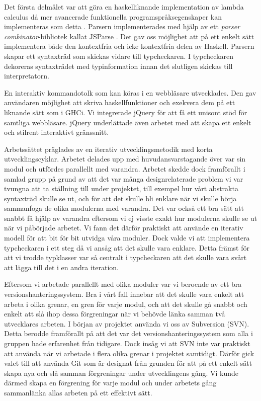 Det första delmålet var att göra en haskelliknande implementation av lambda calculus då mer avancerade funktionella programspråksegenskaper kan implementeras som detta \citep{jones87}.
Parsern implementerades med hjälp av ett \emph{parser combinator}-bibliotek kallat JSParse \citep{jsparse}. Det gav oss möjlighet att på ett enkelt sätt implementera både den kontextfria och icke kontextfria delen av Haskell. Parsern skapar ett syntaxträd som skickas vidare till typcheckaren. I typcheckaren dekoreras syntaxträdet med typinformation innan det slutligen skickas till interpretatorn.

En interaktiv kommandotolk som kan köras i en webbläsare utvecklades. Den gav användaren möjlighet att skriva haskellfunktioner och exekvera dem på ett liknande sätt som i GHCi. 
Vi integrerade jQuery \citep{jquery} för att få ett unisont stöd för samtliga webbläsare. jQuery underlättade även arbetet med att skapa ett enkelt och stilrent interaktivt gränssnitt.

Arbetssättet präglades av en iterativ utvecklingsmetodik med korta utvecklingscyklar. Arbetet delades upp med huvudansvarstagande över var sin modul och utfördes parallellt med varandra. Arbetet skedde dock framförallt i samlad grupp på grund av att det var många designrelaterade problem vi var tvungna att ta ställning till under projektet, till exempel hur vårt abstrakta syntaxträd skulle se ut, och för att det skulle bli enklare när vi skulle börja sammanfoga de olika modulerna med varandra. 
Det var också ett bra sätt att snabbt få hjälp av varandra eftersom vi ej visste exakt hur modulerna skulle se ut när vi påbörjade arbetet. Vi fann det därför praktiskt att använde en iterativ modell för att bit för bit utvidga våra moduler. Dock valde vi att implementera typcheckaren i ett steg då vi ansåg att det skulle vara enklare. Detta främst för att vi trodde typklasser var så centralt i typcheckaren att det skulle vara svårt att lägga till det i en andra iteration. 

Eftersom vi arbetade parallellt med olika moduler var vi beroende av ett bra versionshanteringssystem. Bra i vårt fall innebar att det skulle vara enkelt att arbeta i olika grenar, en gren för varje modul, och att det skulle gå snabbt och enkelt att slå ihop dessa förgreningar när vi behövde länka samman två utvecklares arbeten. I början av projektet använda vi oss av Subversion (SVN). Detta berodde framförallt på att det var det versionshanteringssystem som alla i gruppen hade erfarenhet från tidigare. Dock insåg vi att SVN inte var praktiskt att använda när vi arbetade i flera olika grenar i projektet samtidigt. Därför gick valet till att använda Git som är designat från grunden för att på ett enkelt sätt skapa nya och slå samman förgreningar under utvecklingens gång. Vi kunde därmed skapa en förgrening för varje modul och under arbetets gång sammanlänka allas arbeten på ett effektivt sätt. 

